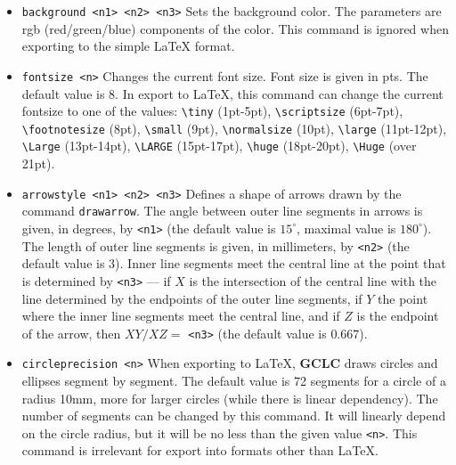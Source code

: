 \documentclass[a4paper]{book}
\newcommand{\gclc}{{\bfseries GCLC}\xspace}
\begin{document}
\begin{itemize}
\item \verb|background <n1> <n2> <n3>|
        Sets the background color. The parameters are {\sc rgb}
        (red/green/blue) components of the color. This command
        is ignored when exporting to the simple \LaTeX{} format.

\item \verb|fontsize <n>|
        Changes the current font size. Font size is given in pts.
        The default value is 8. In export to \LaTeX, this command
        can change the current fontsize to one of the values:
        \verb|\tiny| (1pt-5pt), \verb|\scriptsize|   (6pt-7pt),
        \verb|\footnotesize| (8pt), \verb|\small| (9pt),
        \verb|\normalsize|   (10pt), \verb|\large| (11pt-12pt),
        \verb|\Large|        (13pt-14pt), \verb|\LARGE| (15pt-17pt),
        \verb|\huge|         (18pt-20pt), \verb|\Huge| (over 21pt).

\item \verb|arrowstyle <n1> <n2> <n3>|
        Defines a shape of arrows drawn by the command \verb|drawarrow|.
        The angle between outer line segments in arrows is given, in degrees,
        by \verb|<n1>| (the default value is $15^\circ$, maximal value is $180^\circ$).
        The length of outer line segments is given, in millimeters,
        by \verb|<n2>| (the default value is $3$).
        Inner line segments meet the central line at the point that is
        determined by \verb|<n3>| --- if $X$ is the intersection of the
        central line with the line determined by the endpoints of the
        outer line segments, if $Y$ the point where the inner line
        segments meet the central line, and if $Z$ is the endpoint of
        the arrow, then $XY/XZ=$ \verb|<n3>| (the default value is $0.667$).

\item \verb|circleprecision <n>|
        When exporting to \LaTeX{}, \gclc draws circles and ellipses segment
        by segment. The default value is 72 segments for a circle of
        a radius 10mm, more for larger circles (while there is linear
        dependency). The number of segments can be changed by this command.
        It will linearly depend on the circle radius, but it will
        be no less than the given value \verb|<n>|. This command is
        irrelevant for export into formats other than \LaTeX{}.


\end{itemize}
\end{document}
